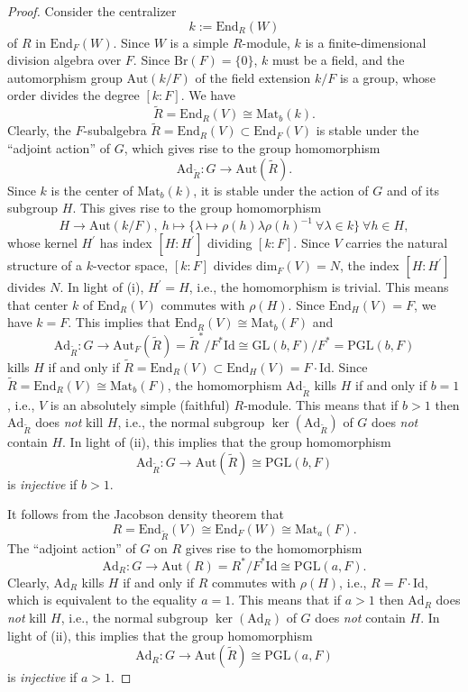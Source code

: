 \documentclass[12pt,a4paper,reqno]{amsart}
\def\End{\mathrm{End}}
\def\Aut{\mathrm{Aut}}
\def\Mat{\mathrm{Mat}}
\def\Id{\mathrm{Id}}
\def\GL{\mathrm{GL}}
\def\PGL{\mathrm{PGL}}
\def\dim{\mathrm{dim}}
\theoremstyle{definition}
\begin{document}
\begin{proof}
Consider the centralizer
    $$k:=\End_R(W)$$
    of $R$ in $\End_F(W)$.
Since $W$ is a simple $R$-module, $k$ is a finite-dimensional division algebra over $F$. Since $\mathrm{Br}(F)=\{0\}$, $k$ must be a field,
and the automorphism group $\Aut(k/F)$ of the field extension $k/F$ is   a group, whose order divides the degree $[k:F]$.
We have
    $$\tilde{R}=\End_R(V) \cong \Mat_b(k).$$
Clearly,  the $F$-subalgebra $\tilde{R}=\End_R(V) \subset \End_{F}(V)$ is stable under the ``adjoint action'' of $G$, which gives rise to the group homomorphism
$$\mathrm{Ad}_{\tilde{R}}: G \to\Aut(\tilde{R}).$$
 Since $k$ is the center of $\Mat_b(k)$, it is stable under the action of $G$ and of its subgroup $H$. This gives rise to the group homomorphism 
 $$H\to\Aut(k/F), \  h \mapsto \{\lambda \mapsto  \rho(h)\lambda \rho(h)^{-1} \ \forall  \lambda\in k\} \ \forall h \in H,$$ whose 
  kernel $H^{\prime}$ has index $[H:H^{\prime}]$ dividing  $[k:F]$. Since $V$ carries the natural structure of a $k$-vector space, 
  $[k:F]$ divides $\dim_F(V)=N$, the index  $[H:H^{\prime}]$ divides $N$. In light of (i), $H^{\prime}=H$, i.e., the homomorphism is trivial.
  This means that
center $k$ of $\End_R(V)$ commutes with $\rho(H)$. Since $\End_H(V)=F$, we have $k=F$. This implies that
$\End_R(V) \cong \Mat_b(F)$ and
$$\mathrm{Ad}_{\tilde{R}}: G \to \Aut_F(\tilde{R})=\tilde{R}^{*}/F^{*}\Id \cong\GL(b,F)/F^*=\PGL(b,F)$$
 kills $H$ if and only if
$\tilde{R}=\End_R(V) \subset \End_H(V)=F \cdot \Id$.
 Since $\tilde{R}=\End_R(V) \cong \Mat_b(F)$, the homomorphism $\mathrm{Ad}_{\tilde{R}}$ kills $H$  if and only if $b=1$, i.e., $V$ is an absolutely simple (faithful) $R$-module.
 This means that if $b>1$ then   $\mathrm{Ad}_{\tilde{R}}$ does {\sl not} kill $H$, i.e., the normal subgroup $\ker(\mathrm{Ad}_{\tilde{R}})$ of $G$ does {\sl not} contain $H$.
  In light of (ii), this implies that the group homomorphism
 $$\mathrm{Ad}_{\tilde{R}}: G \to \Aut(\tilde{R}) \cong \PGL(b,F)$$
 is {\sl injective} if $b>1$.

 It follows from the Jacobson density theorem that
 $$R=\End_{\tilde{R}}(V) \cong \End_F(W) \cong \Mat_a(F).$$
The ``adjoint action''   of $G$ on $R$ gives rise to the homomorphism
    $$\mathrm{Ad}_R: G  \to  \Aut(R)=R^{*}/F^{*}\Id \cong \PGL(a,F).$$
 Clearly, $\mathrm{Ad}_R$ kills $H$ if and only if $R$ commutes with $\rho(H)$, i.e., $R=F \cdot\Id$, which is equivalent to the equality $a=1$.
 This means that if $a>1$ then   $\mathrm{Ad}_R$ does {\sl not} kill $H$, i.e., the normal subgroup $\ker(\mathrm{Ad}_{R})$ of $G$ 
 does {\sl not} contain $H$.
  In light of (ii), this implies that the group homomorphism
 $$\mathrm{Ad}_R: G \to \Aut(\tilde{R}) \cong \PGL(a,F)$$
 is {\sl injective} if $a>1$.
 

\end{proof}
\end{document}

